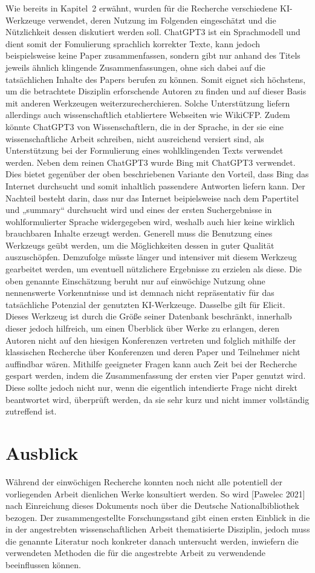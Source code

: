 Wie bereits in Kapitel 2 erwähnt, wurden für die Recherche verschiedene KI-Werkzeuge verwendet, deren Nutzung im Folgenden eingeschätzt und die Nützlichkeit dessen diskutiert werden soll. 
ChatGPT3 ist ein Sprachmodell und dient somit der Fomulierung sprachlich korrekter Texte, kann jedoch beispielsweise keine Paper zusammenfassen, sondern gibt nur anhand des Titels jeweils ähnlich klingende Zusammenfassungen, ohne sich dabei auf die tatsächlichen Inhalte des Papers berufen zu können. Somit eignet sich höchstens, um die betrachtete Disziplin erforschende Autoren zu finden und auf dieser Basis mit anderen Werkzeugen weiterzurecherchieren. Solche Unterstützung liefern allerdings auch wissenschaftlich etabliertere Webseiten wie WikiCFP. Zudem könnte ChatGPT3 von Wissenschaftlern, die in der Sprache, in der sie eine wissenschaftliche Arbeit schreiben, nicht ausreichend versiert sind, als Unterstützung bei der Formulierung eines wohlklingenden Texts verwendet werden.
Neben dem reinen ChatGPT3 wurde Bing mit ChatGPT3 verwendet. Dies bietet gegenüber der oben beschriebenen Variante den Vorteil, dass Bing das Internet durchsucht und somit inhaltlich passendere Antworten liefern kann. Der Nachteil besteht darin, dass nur das Internet beipielsweise nach dem Papertitel und „summary“ durchsucht wird und eines der ersten Suchergebnisse in wohlformulierter Sprache widergegeben wird, weshalb auch hier keine wirklich brauchbaren Inhalte erzeugt werden.
Generell muss die Benutzung eines Werkzeugs geübt werden, um die Möglichkeiten dessen in guter Qualität auszuschöpfen. Demzufolge müsste länger und intensiver mit diesem Werkzeug gearbeitet werden, um eventuell nützlichere Ergebnisse zu erzielen als diese. Die oben genannte Einschätzung beruht nur auf einwöchige Nutzung ohne nennenswerte Vorkenntnisse und ist demnach nicht repräsentativ für das tatsächliche Potenzial der genutzten KI-Werkzeuge.
Dasselbe gilt für Elicit. Dieses Werkzeug ist durch die Größe seiner Datenbank beschränkt, innerhalb dieser jedoch hilfreich, um einen Überblick über Werke zu erlangen, deren Autoren nicht auf den hiesigen Konferenzen vertreten und folglich mithilfe der klassischen Recherche über Konferenzen und deren Paper und Teilnehmer nicht auffindbar wären. Mithilfe geeigneter Fragen kann auch Zeit bei der Recherche gespart werden, indem die Zusammenfassung der ersten vier Paper genutzt wird. Diese sollte jedoch nicht nur, wenn die eigentlich intendierte Frage nicht direkt beantwortet wird, überprüft werden, da sie sehr kurz und nicht immer vollständig zutreffend ist.
\section{Ausblick}
Während der einwöchigen Recherche konnten noch nicht alle potentiell der vorliegenden Arbeit dienlichen Werke konsultiert werden. So wird [Pawelec 2021] nach Einreichung dieses Dokuments noch über die Deutsche Nationalbibliothek bezogen.
Der zusammengestellte Forschungsstand gibt einen ersten Einblick in die in der angestrebten wissenschaftlichen Arbeit thematisierte Disziplin, jedoch muss die genannte Literatur noch konkreter danach untersucht werden, inwiefern die verwendeten Methoden die für die angestrebte Arbeit zu verwendende beeinflussen können.
